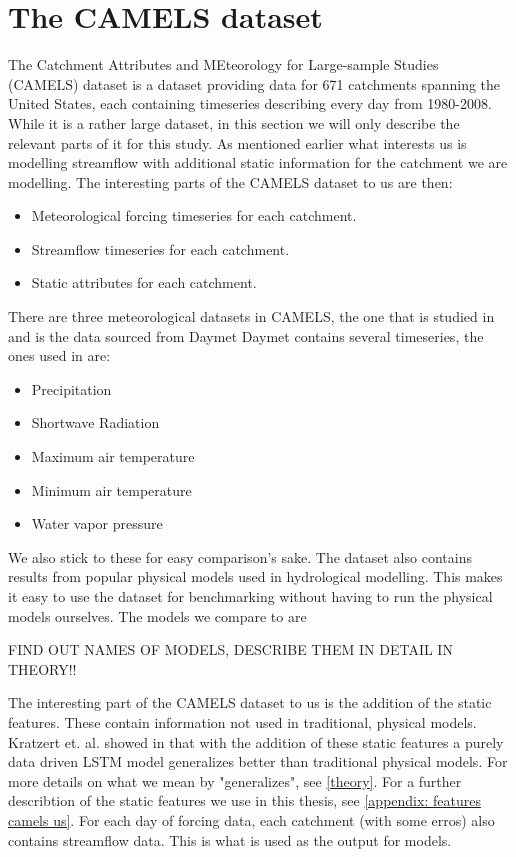 \section{The CAMELS dataset}
The Catchment Attributes and MEteorology for Large-sample Studies (CAMELS) dataset \cite{CAMELS_US}
is a dataset providing data for 671 catchments spanning the United States, each
containing timeseries describing every day from 1980-2008. While 
it is a rather large dataset, 
in this section we will only describe the relevant parts of it for this study. 
As mentioned earlier what interests us is modelling streamflow with additional 
static information for the catchment we are modelling. The interesting parts of
the CAMELS dataset to us are then:
\begin{itemize}
    \item Meteorological forcing timeseries for each catchment.
    \item Streamflow timeseries for each catchment.
    \item Static attributes for each catchment.
\end{itemize}
There are three meteorological datasets in CAMELS, the one that is studied in \cite{CAMELS_US}
and \cite{lstm_second_paper} is the data sourced from Daymet \cite{thornton2012daymet}
Daymet contains several timeseries, the ones used in \cite{lstm_second_paper} are:
\begin{itemize}
    \item Precipitation
    \item Shortwave Radiation
    \item Maximum air temperature
    \item Minimum air temperature
    \item Water vapor pressure
\end{itemize}
We also stick to these for easy comparison's sake.
The dataset also contains results from popular physical models used in hydrological 
modelling. This makes it easy to use the dataset for benchmarking without having 
to run the physical models ourselves. The models we compare to are \begin{Large}
FIND OUT NAMES OF MODELS, DESCRIBE THEM IN DETAIL IN THEORY!!
\end{Large}
The interesting part of the CAMELS dataset to us is the addition of the static 
features. These contain information not used in traditional, physical models. 
Kratzert et. al. showed in \cite{lstm_second_paper} \cite{lstm_third_paper} that
with the addition of these static features a purely data driven LSTM model generalizes
better than traditional physical models. For more details on what we mean by 
"generalizes", see \ref{theory}. For a further describtion of the static features
we use in this thesis, see \ref{appendix: features camels us}.
For each day of forcing data, each catchment (with some erros) also contains 
streamflow data. This is what is used as the output for models.


